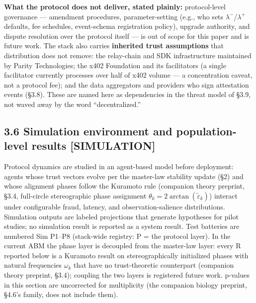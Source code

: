 \documentclass[
]{article}
\begin{document}
\textbf{What the protocol does not deliver, stated plainly:}
protocol-level governance --- amendment procedures, parameter-setting
(e.g., who sets \(\lambda^{-}\)/\(\lambda^{+}\) defaults, fee schedules,
event-schema registration policy), upgrade authority, and dispute
resolution over the protocol itself --- is out of scope for this paper
and is future work. The stack also carries \textbf{inherited trust
assumptions} that distribution does not remove: the relay-chain and SDK
infrastructure maintained by Parity Technologies; the x402 Foundation
and its facilitators (a single facilitator currently processes over half
of x402 volume --- a concentration caveat, not a protocol fee); and the
data aggregators and providers who sign attestation events (§3.8). These
are named here as dependencies in the threat model of §3.9, not waved
away by the word ``decentralized.''

\subsection{3.6 Simulation environment and population-level results
{[}SIMULATION{]}}\label{simulation-environment-and-population-level-results-simulation}

Protocol dynamics are studied in an agent-based model before deployment:
agents whose trust vectors evolve per the master-law stability update
(§2) and whose alignment phases follow the Kuramoto rule (companion
theory preprint, §3.4, full-circle stereographic phase assignment
\(\theta_k = 2\arctan(\tilde{\varepsilon}_k)\)) interact under
configurable fraud, latency, and observation-salience distributions.
Simulation outputs are labeled projections that generate hypotheses for
pilot studies; no simulation result is reported as a system result. Test
batteries are numbered Sim P1--P8 (stack-wide registry: P = the protocol
layer). In the current ABM the phase layer is decoupled from the
master-law layer: every R reported below is a Kuramoto result on
stereographically initialized phases with natural frequencies
\(\omega_k\) that have no trust-theoretic counterpart (companion theory
preprint, §3.4); coupling the two layers is registered future work.
p-values in this section are uncorrected for multiplicity (the companion
biology preprint, §4.6's family, does not include them).
\end{document}
